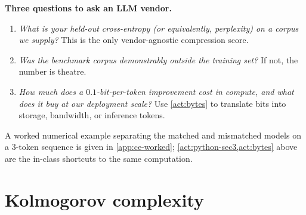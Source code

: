 \documentclass[12pt,a4paper]{article}
\theoremstyle{plain}
\theoremstyle{definition}
\begin{document}
\begin{decisionbox}
\textbf{Three questions to ask an LLM vendor.}
\begin{enumerate}[leftmargin=*, itemsep=2pt]
  \item \emph{What is your held-out cross-entropy (or equivalently,
        perplexity) on a corpus we supply?}  This is the only
        vendor-agnostic compression score.
  \item \emph{Was the benchmark corpus demonstrably outside the
        training set?}  If not, the number is theatre.
  \item \emph{How much does a $0.1$-bit-per-token improvement cost in
        compute, and what does it buy at our deployment scale?}
        Use \cref{act:bytes} to translate bits into storage,
        bandwidth, or inference tokens.
\end{enumerate}
\end{decisionbox}

A worked numerical example separating the matched and mismatched
models on a $3$-token sequence is given in \cref{app:ce-worked};
\cref{act:python-sec3,act:bytes} above are the in-class shortcuts to the
same computation.


\section{Kolmogorov complexity}
\label{sec:kolmogorov}
\end{document}
